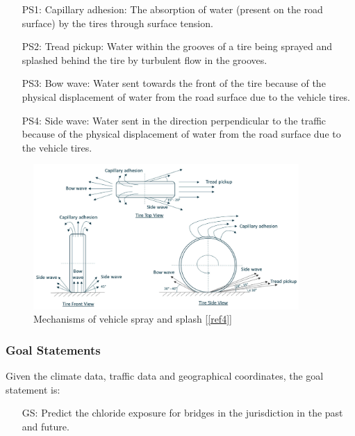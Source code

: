 \documentclass[12pt]{article}
\newcounter{goalnum} %
\newcommand{\reref}[1]{\ref{#1}}
\begin{document}
\begin{itemize}

\item[PS1:] Capillary adhesion: The absorption of water (present on the road surface) by the tires through surface tension.

\item[PS2:] Tread pickup: Water within the grooves of a tire being sprayed and splashed behind the tire by turbulent flow in the grooves.

\item[PS3:] Bow wave: Water sent towards the front of the tire because of the physical displacement of water from the road surface due to the vehicle tires.

\item[PS4:] Side wave: Water sent in the direction perpendicular to the traffic because of the physical displacement of water from the road surface due to the vehicle tires.

\end{itemize}


\begin{figure}[h!]
\begin{center}
\includegraphics[width=0.9\textwidth]{phymodel}
\caption{\label{4mechanism} Mechanisms of vehicle spray and splash [\reref{ref4}]}

\end{center}
\end{figure}

\newpage
\subsubsection{Goal Statements}

\noindent Given the climate data, traffic data and geographical coordinates, the goal statement is:

\begin{itemize}

\item[GS\refstepcounter{goalnum}\thegoalnum \label{G_ChlorideExposurePrediction}:] Predict the chloride exposure for bridges in the jurisdiction in the past and future.
\end{itemize}
\end{document}
